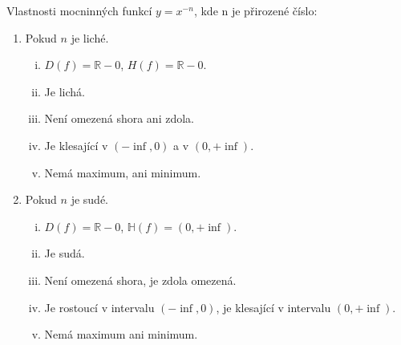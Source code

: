 \begin{veta}
  Vlastnosti mocninných funkcí $y= x^{-n}$, kde n je přirozené číslo:
  \begin{enumerate}[1.]
    \item Pokud $n$ je liché.
    \begin{enumerate}[i.]
      \item $D(f)= \mathbb R - {0}$, $H(f)= \mathbb R - {0}$.
      \item Je lichá.
      \item Není omezená shora ani zdola.
      \item Je klesající v $( -\inf,0)$ a v $( 0,+\inf )$.
      \item Nemá maximum, ani minimum.
    \end{enumerate}
    \item Pokud $n$ je sudé.
    \begin{enumerate}[i.]
      \item $D(f)= \mathbb R - {0}$, $\mathbb H(f)= ( 0,+\inf )$.
      \item Je sudá.
      \item Není omezená shora, je zdola omezená.
      \item Je rostoucí v intervalu $( -\inf,0 ) $, je klesající v intervalu $( 0,+\inf )$.
      \item Nemá maximum ani minimum.
    \end{enumerate}
  \end{enumerate}
\end{veta}
